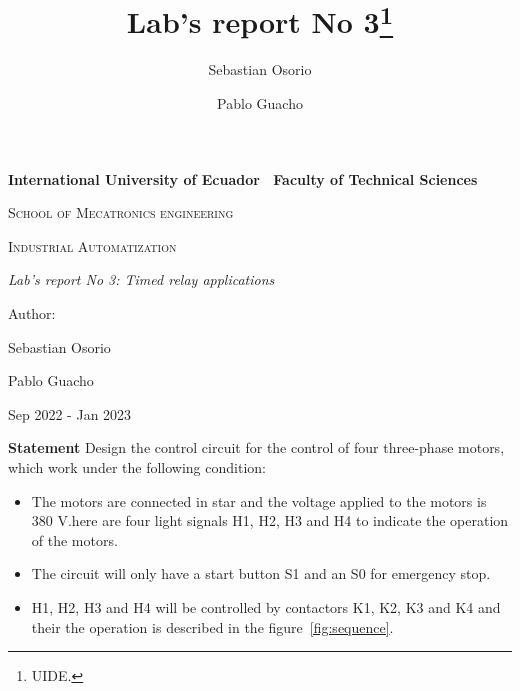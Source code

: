 \documentclass[runningheads]{llncs}
\begin{document}
\begin{titlepage}
\centering
{\bfseries\LARGE International University of Ecuador \ 
Faculty of Technical Sciences  \par}
\vspace{1cm}
{\scshape\Large School of Mecatronics engineering \par}
\vspace{3cm}
{\scshape\Huge Industrial Automatization \par}
\vspace{3cm}
{\itshape\Large Lab's report No 3: Timed relay applications \par}
\vfill
{\Large Author: \par}
{\Large Sebastian Osorio \par Pablo Guacho \par}
\vfill
{\Large Sep 2022 - Jan 2023 \par}
\end{titlepage}
\newpage


\title{Lab's report No 3\thanks{UIDE.}}
\author{Sebastian Osorio \and Pablo Guacho}



\maketitle

\textbf{Statement }Design  the  control  circuit  for  the  control  of  four  three-phase  motors,  which  work  under  the 
following condition:  
\begin{itemize}
    \item The motors are connected in star and the voltage applied to the motors is 380 V.here are four light signals H1, H2, H3 
    and H4 to indicate the operation of the motors. 
    \item The circuit will only have a start button S1 and an S0 for emergency stop. 
    \item H1, H2, H3 and H4 will be controlled by contactors K1, K2, K3 and K4 and their the operation is described in the
    figure~\ref{fig:sequence}. 
\end{itemize}
\end{document}

